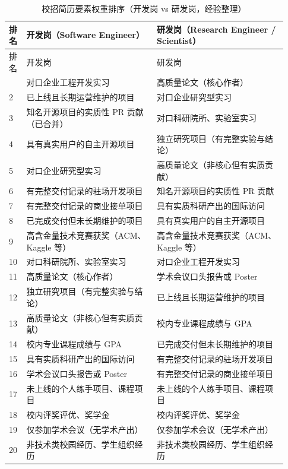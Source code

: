 \documentclass[UTF8,zihao=5,openany]{ctexbook}
\begin{document}
\begin{center}\footnotesize
\setlength{\tabcolsep}{3pt}\begin{longtable}{p{0.05\linewidth}p{0.44\linewidth}p{0.44\linewidth}}
\caption{校招简历要素权重排序（开发岗 vs 研发岗，经验整理）}\\
\toprule
排名 & 开发岗（Software Engineer） & 研发岗（Research Engineer / Scientist） \\
\midrule
\endfirsthead
\toprule
排名 & 开发岗 & 研发岗 \\
\midrule
\endhead
\bottomrule
\endlastfoot
1 & 对口企业工程开发实习 & 高质量论文（核心作者） \\
2 & 已上线且长期运营维护的项目 & 对口企业研究型实习 \\
3 & 知名开源项目的实质性 PR 贡献（已合并） & 对口科研院所、实验室实习 \\
4 & 具有真实用户的自主开源项目 & 独立研究项目（有完整实验与结论） \\
5 & 对口企业研究型实习 & 高质量论文（非核心但有实质贡献） \\
6 & 有完整交付记录的驻场开发项目 & 知名开源项目的实质性 PR 贡献 \\
7 & 有完整交付记录的商业接单项目 & 具有实质科研产出的国际访问 \\
8 & 已完成交付但未长期维护的项目 & 具有真实用户的自主开源项目 \\
9 & 高含金量技术竞赛获奖（ACM、Kaggle 等） & 高含金量技术竞赛获奖（ACM、Kaggle 等） \\
10 & 对口科研院所、实验室实习 & 对口企业工程开发实习 \\
11 & 高质量论文（核心作者） & 学术会议口头报告或 Poster \\
12 & 独立研究项目（有完整实验与结论） & 已上线且长期运营维护的项目 \\
13 & 高质量论文（非核心但有实质贡献） & 校内专业课程成绩与 GPA \\
14 & 校内专业课程成绩与 GPA & 已完成交付但未长期维护的项目 \\
15 & 具有实质科研产出的国际访问 & 有完整交付记录的驻场开发项目 \\
16 & 学术会议口头报告或 Poster & 有完整交付记录的商业接单项目 \\
17 & 未上线的个人练手项目、课程项目 & 未上线的个人练手项目、课程项目 \\
18 & 校内评奖评优、奖学金 & 校内评奖评优、奖学金 \\
19 & 仅参加学术会议（无学术产出） & 仅参加学术会议（无学术产出） \\
20 & 非技术类校园经历、学生组织经历 & 非技术类校园经历、学生组织经历 \\
\end{longtable}
\end{center}
\end{document}
